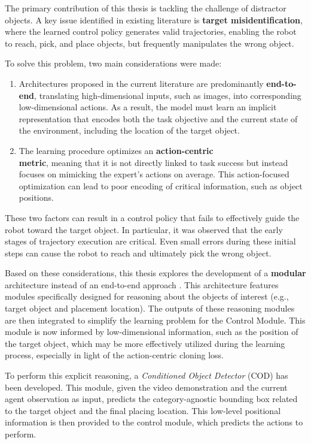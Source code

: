 The primary contribution of this thesis is tackling the challenge of distractor objects. A key issue identified in existing literature is \textbf{target misidentification}, where the learned control policy generates valid trajectories, enabling the robot to reach, pick, and place objects, but frequently manipulates the wrong object.

To solve this problem, two main considerations were made:

\begin{enumerate}[label=\textbf{(\arabic*)}]
    \item Architectures proposed in the current literature are predominantly \textbf{end-to-end}, translating high-dimensional inputs, such as images, into corresponding low-dimensional actions. As a result, the model must learn an implicit representation that encodes both the task objective and the current state of the environment, including the location of the target object.
    \item The learning procedure optimizes an \textbf{action-centric \\ metric}, meaning that it is not directly linked to task success but instead focuses on mimicking the expert's actions on average. This action-focused optimization can lead to poor encoding of critical information, such as object positions.
\end{enumerate}

These two factors can result in a control policy that fails to effectively guide the robot toward the target object. In particular, it was observed that the early stages of trajectory execution are critical. Even small errors during these initial steps can cause the robot to reach and ultimately pick the wrong object.

Based on these considerations, this thesis explores the development of a \textbf{modular} architecture instead of an end-to-end approach \cite{foggia2024enhancing,foggia2024improving}. This architecture features modules specifically designed for reasoning about the objects of interest (e.g., target object and placement location). The outputs of these reasoning modules are then integrated to simplify the learning problem for the Control Module. This module is now informed by low-dimensional information, such as the position of the target object, which may be more effectively utilized during the learning process, especially in light of the action-centric cloning loss.

To perform this explicit reasoning, a \textit{Conditioned Object Detector} (COD) has been developed. This module, given the video demonstration and the current agent observation as input, predicts the category-agnostic bounding box related to the target object and the final placing location. This low-level positional information is then provided to the control module, which predicts the actions to perform.

